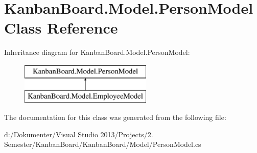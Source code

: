 \hypertarget{class_kanban_board_1_1_model_1_1_person_model}{}\section{Kanban\+Board.\+Model.\+Person\+Model Class Reference}
\label{class_kanban_board_1_1_model_1_1_person_model}
Inheritance diagram for Kanban\+Board.\+Model.\+Person\+Model\+:\begin{figure}[H]
\begin{center}
\leavevmode
\includegraphics[height=2.000000cm]{class_kanban_board_1_1_model_1_1_person_model}
\end{center}
\end{figure}


The documentation for this class was generated from the following file\+:\begin{DoxyCompactItemize}
\item 
d\+:/\+Dokumenter/\+Visual Studio 2013/\+Projects/2. Semester/\+Kanban\+Board/\+Kanban\+Board/\+Model/Person\+Model.\+cs\end{DoxyCompactItemize}
